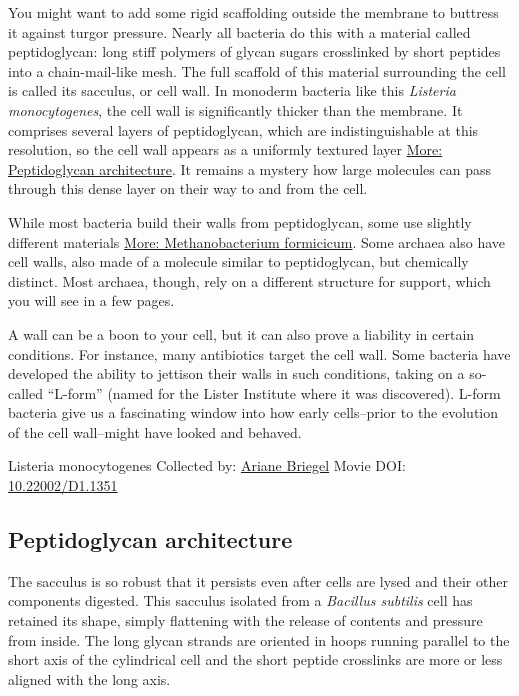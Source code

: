 \documentclass[]{tufte-book}
\begin{document}
You might want to add some rigid scaffolding outside the membrane to buttress it against turgor pressure. Nearly all bacteria do this with a material called peptidoglycan: long stiff polymers of glycan sugars crosslinked by short peptides into a chain-mail-like mesh. The full scaffold of this material surrounding the cell is called its sacculus, or cell wall. In monoderm bacteria like this \emph{Listeria monocytogenes}, the cell wall is significantly thicker than the membrane. It comprises several layers of peptidoglycan, which are indistinguishable at this resolution, so the cell wall appears as a uniformly textured layer \protect\hyperlink{Peptidoglycan_architecture}{More: Peptidoglycan architecture}. It remains a mystery how large molecules can pass through this dense layer on their way to and from the cell.

While most bacteria build their walls from peptidoglycan, some use slightly different materials \protect\hyperlink{Methanobacterium_formicicum}{More: Methanobacterium formicicum}. Some archaea also have cell walls, also made of a molecule similar to peptidoglycan, but chemically distinct. Most archaea, though, rely on a different structure for support, which you will see in a few pages.

A wall can be a boon to your cell, but it can also prove a liability in certain conditions. For instance, many antibiotics target the cell wall. Some bacteria have developed the ability to jettison their walls in such conditions, taking on a so-called ``L-form'' (named for the Lister Institute where it was discovered). L-form bacteria give us a fascinating window into how early cells--prior to the evolution of the cell wall--might have looked and behaved.



\hypertarget{htmlwidget-3b779a04912068e6422b}{}

\label{fig:2-2}Listeria monocytogenes Collected by: \protect\hyperlink{ariane_briegel}{Ariane Briegel} Movie DOI: \href{https://doi.org/10.22002/D1.1351}{10.22002/D1.1351}

\hypertarget{Peptidoglycan_architecture}{%
\subsection{Peptidoglycan architecture}\label{Peptidoglycan_architecture}}

The sacculus is so robust that it persists even after cells are lysed and their other components digested. This sacculus isolated from a \emph{Bacillus subtilis} cell has retained its shape, simply flattening with the release of contents and pressure from inside. The long glycan strands are oriented in hoops running parallel to the short axis of the cylindrical cell and the short peptide crosslinks are more or less aligned with the long axis.
\end{document}
